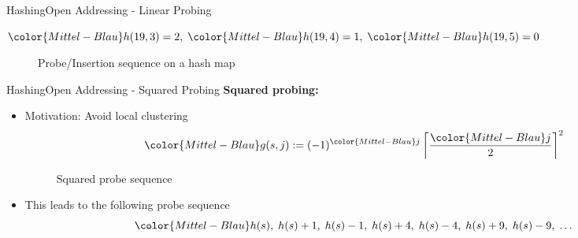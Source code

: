 \begin{frame}{Hashing}{Open Addressing - Linear Probing}
\begin{itemize}
\begin{math}
        {\color{Mittel-Blau}h(19, 3)} = 2 ,\;
        {\color{Mittel-Blau}h(19, 4)} = 1 ,\;
        {\color{Mittel-Blau}h(19, 5)} = 0
      \end{math}
      \begin{figure}[!h]
        \def\LPEData{
          {19, {\color{green2}F}}/0,
          {15, {\color{green2}D}}/1,
          {2, {\color{green2}E}}/2,
          {5, {\color{green2}C}}/3,
          {53, {\color{green2}B}}/4,
          {12, {\color{green2}A}}/5,
          \relax/6
        }%
        \def\LPEShowIndex{0}%
        \begin{adjustbox}{width=0.75\linewidth}%
        \end{adjustbox}
        \vspace{-0.5em}%
        \caption{Probe/Insertion sequence on a hash map}%
        \label{fig:hashing:open_addressing:linear_probing_example7}%
      \end{figure}
  \end{itemize}
\end{frame}


\begin{frame}{Hashing}{Open Addressing - Squared Probing}
  \textbf{Squared probing:}
  \begin{itemize}
    \item<2->
      Motivation: Avoid local clustering
      \begin{displaymath}
        {\color{Mittel-Blau}g(s,j)}
        := (-1)^{\color{Mittel-Blau}j}
        \left\lceil \frac{{\color{Mittel-Blau}j}}{2} \right\rceil^2
      \end{displaymath}
    \vspace{-2.0em}
  \begin{figure}[!h]
    \begin{adjustbox}{width=0.7\linewidth}%
    \end{adjustbox}
    \vspace{-1.0em}
    \caption{Squared probe sequence}%
    \label{fig:hashing:open_addressing:squared_probing}%
  \end{figure}
    \item<4->
      This leads to the following probe sequence
      \begin{displaymath}
        {\color{Mittel-Blau}h(s) ,\;
        h(s)+1 ,\;
        h(s)-1 ,\;
        h(s)+4 ,\;
        h(s)-4 ,\;
        h(s)+9 ,\;
        h(s)-9 ,\;}
        \dotsc
      \end{displaymath}
  \end{itemize}
  \vspace{1.0em}
\end{frame}

